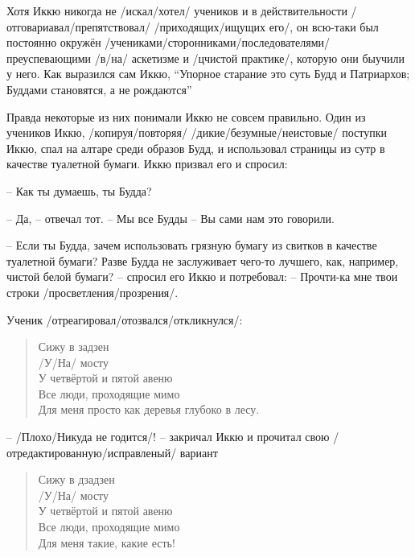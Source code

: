 \begin{ver}
Хотя Иккю никогда не /искал/хотел/ учеников и в действительности
/отговариавал/препятствовал/ /приходящих/ищущих его/,
он всю-таки был постоянно окружён
/учениками/сторонниками/последователями/
преуспевающими /в/на/ аскетизме и /цчистой практике/, которую они
быучили у него. Как выразился сам Иккю, ``Упорное старание это
суть Будд и Патриархов; Буддами становятся, а не
рождаются''

Правда некоторые из них понимали Иккю не совсем
правильно. Один из учеников Иккю,
/копируя/повторяя/ /дикие/безумные/неистовые/ поступки Иккю, спал на
алтаре среди образов Будд, и использовал страницы из сутр в качестве
туалетной бумаги. Иккю призвал его и спросил:

-- Как ты думаешь, ты Будда?

-- Да, -- отвечал тот. -- Мы все Будды -- Вы сами нам это говорили.

-- Если ты Будда, зачем использовать грязную бумагу из свитков в
качестве туалетной бумаги? Разве Будда не заслуживает чего-то лучшего,
как, например, чистой белой бумаги? -- спросил его Иккю и потребовал: -- Прочти-ка
мне твои строки /просветления/прозрения/.

Ученик /отреагировал/отозвался/откликнулся/:
\end{ver}

\begin{ver}
  \begin{verse}
    Сижу в задзен\\
    /У/На/ мосту\\
    У четвёртой и пятой авеню\\
    Все люди, проходящие мимо\\
    Для меня просто как деревья глубоко в лесу. 
  \end{verse}
\end{ver}

\begin{ver}
  -- /Плохо/Никуда не годится/! -- закричал Иккю и прочитал свою
/отредактированную/исправленый/ вариант
\end{ver}

\begin{ver}
  \begin{verse}
    Сижу в дзадзен\\
    /У/На/ мосту\\
    У четвёртой и пятой авеню\\
    Все люди, проходящие мимо\\
    Для меня такие, какие есть! 
  \end{verse}
\end{ver}

